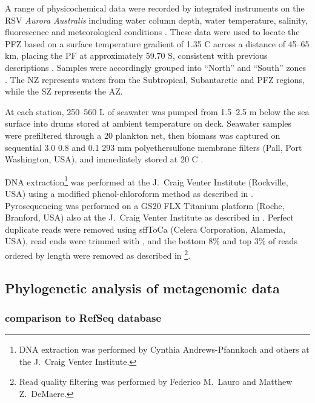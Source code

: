 

A range of physicochemical data were recorded by integrated instruments on the RSV \emph{Aurora Australis} including water column depth, water temperature, salinity, fluorescence and meteorological conditions .
These data were used to locate the \ac{PFZ} based on a surface temperature gradient of \textapprox{}1.35 \textdegree{}C across a distance of 45--65 km, placing the \ac{PF} at approximately 59.70\textdegree{} S, consistent with previous descriptions \cite{Moore:1999to,Sokolov:2002tc}.
Samples were accordingly grouped into ``North'' and ``South'' zones .
The \ac{NZ} represents waters from the Subtropical, Subantarctic and \ac{PFZ} regions, while the \ac{SZ} represents the \ac{AZ}.



At each station, \textapprox{}250--560 L of seawater was pumped from \textapprox{}1.5--2.5 m below the sea surface into drums stored at ambient temperature on deck. 
Seawater samples were prefiltered through a 20 \micron{} plankton net, then biomass was captured on sequential 3.0 \micron{} 0.8 \micron{} and 0.1 \micron{} 293 mm polyethersulfone membrane filters (Pall, Port Washington, USA), and immediately stored at \textminus{}20 \textdegree{}C \cite{Rusch:2007ez,Ng:2010cd}.

DNA extraction\footnote{DNA extraction was performed by Cynthia Andrews-Pfannkoch and others at the J.\ Craig Venter Institute.} was performed at the J.\ Craig Venter Institute (Rockville, USA) using a modified phenol-chloroform method as described in \citet{Rusch:2007ez}.
Pyrosequencing was performed on a GS20 FLX Titanium platform (Roche, Branford, USA) also at the J.\ Craig Venter Institute as described in \citet{Lauro:2010jna}.
Perfect duplicate reads were removed using sffToCa (Celera Corporation, Alameda, USA),  read ends were trimmed with  \cite{Chou:2001ck}, and the bottom 8\% and top 3\% of reads ordered by length were removed as described in \citet{Lauro:2010jna}\footnote{Read quality filtering was performed by Federico M.\ Lauro and Matthew Z.\ DeMaere.}.

\subsection{Phylogenetic analysis of metagenomic data}

\subsubsection{ comparison to RefSeq database}

